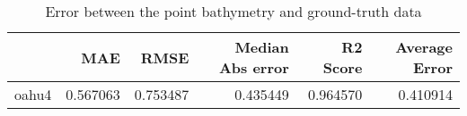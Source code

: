 \begin{table}[h!]
\caption{Error between the point bathymetry and ground-truth data}
\label{tab:oahu4_lidar_error}
\begin{tabular}{lrrrrr}
\toprule
 & MAE & RMSE & Median Abs error & R2 Score & Average Error \\
\midrule
oahu4 & 0.567063 & 0.753487 & 0.435449 & 0.964570 & 0.410914 \\
\bottomrule
\end{tabular}
\end{table}
